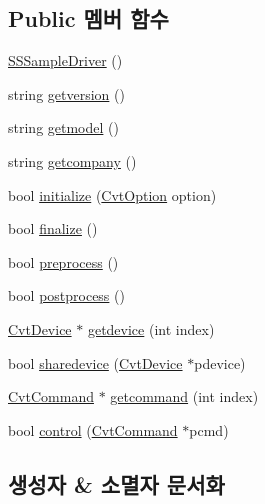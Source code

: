 \subsection*{Public 멤버 함수}
\begin{DoxyCompactItemize}
\item 
\hyperlink{classebiodriver_1_1SSSampleDriver_afac6e5429ff3a9550925c1f62074ff3e}{S\+S\+Sample\+Driver} ()
\item 
string \hyperlink{classebiodriver_1_1SSSampleDriver_a1f8d8cdf1b0580c72379282531b55175}{getversion} ()
\item 
string \hyperlink{classebiodriver_1_1SSSampleDriver_a5964515c4297caa276cf7dc7959c3b0b}{getmodel} ()
\item 
string \hyperlink{classebiodriver_1_1SSSampleDriver_ac5db03ba9751cabd78fd00bbe8a4330b}{getcompany} ()
\item 
bool \hyperlink{classebiodriver_1_1SSSampleDriver_a604f906153e106692bd5869c7fd8888f}{initialize} (\hyperlink{classstdcvt_1_1CvtOption}{Cvt\+Option} option)
\item 
bool \hyperlink{classebiodriver_1_1SSSampleDriver_a43ab28051c128755cbb639d1c2db7ab2}{finalize} ()
\item 
bool \hyperlink{classebiodriver_1_1SSSampleDriver_a39622e2a63b609136d5e6740a329d450}{preprocess} ()
\item 
bool \hyperlink{classebiodriver_1_1SSSampleDriver_aa6dc852c3a6f9f5798a4ad53db7efbe3}{postprocess} ()
\item 
\hyperlink{classstdcvt_1_1CvtDevice}{Cvt\+Device} $\ast$ \hyperlink{classebiodriver_1_1SSSampleDriver_af4bdb5522559606b177416ec408cd4b4}{getdevice} (int index)
\item 
bool \hyperlink{classebiodriver_1_1SSSampleDriver_a268e69de75c71df87c32ad3d4aa29a91}{sharedevice} (\hyperlink{classstdcvt_1_1CvtDevice}{Cvt\+Device} $\ast$pdevice)
\item 
\hyperlink{classstdcvt_1_1CvtCommand}{Cvt\+Command} $\ast$ \hyperlink{classebiodriver_1_1SSSampleDriver_a273a5a2d7a1b54ba4d6d3989db78d152}{getcommand} (int index)
\item 
bool \hyperlink{classebiodriver_1_1SSSampleDriver_a25e63484cfbe11d3bc741c1cad5b240c}{control} (\hyperlink{classstdcvt_1_1CvtCommand}{Cvt\+Command} $\ast$pcmd)
\end{DoxyCompactItemize}


\subsection{생성자 \& 소멸자 문서화}
